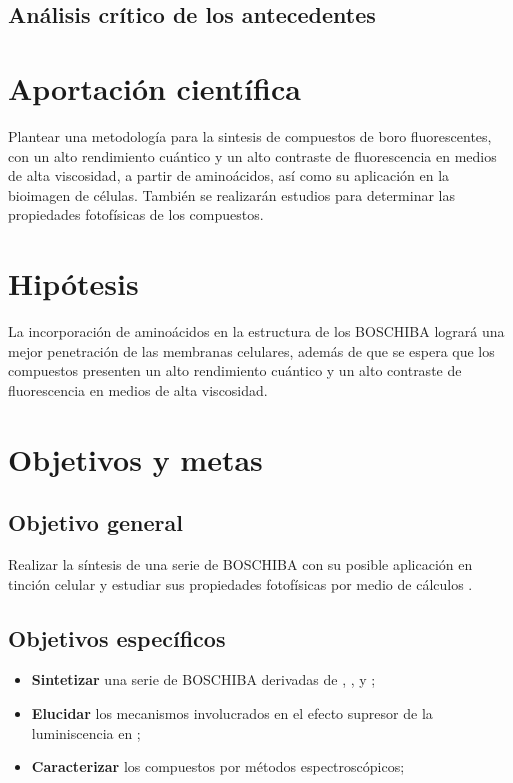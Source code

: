 \documentclass[spanish,mexico]{scrartcl}
\begin{document}
\subsection{Análisis crítico de los antecedentes} %



\section{Aportación científica}
Plantear una metodología para la sintesis de compuestos de boro fluorescentes, con un alto rendimiento cuántico y un alto contraste de fluorescencia en medios de alta viscosidad, a partir de aminoácidos, así como su aplicación en la bioimagen de células. También se realizarán estudios \insilico{} para determinar las propiedades fotofísicas de los compuestos.

\section{Hipótesis}
La incorporación de aminoácidos en la estructura de los \gls{BOSCHIBA} logrará una mejor penetración de las membranas celulares, además de que se espera que los compuestos presenten un alto rendimiento cuántico y un alto contraste de fluorescencia en medios de alta viscosidad.

\section{Objetivos y metas}
\subsection{Objetivo general}
Realizar la síntesis de una serie de \gls{BOSCHIBA} con su posible aplicación en tinción celular y estudiar sus propiedades fotofísicas por medio de cálculos \insilico{}.

\subsection{Objetivos específicos}
\begin{itemize}
    \item \textbf{Sintetizar} una serie de \gls{BOSCHIBA} derivadas de , ,  y ;
    \item \textbf{Elucidar} los mecanismos involucrados en el efecto supresor de la luminiscencia en ;
    \item \textbf{Caracterizar} los compuestos por métodos espectroscópicos;
\end{itemize}
\end{document}
